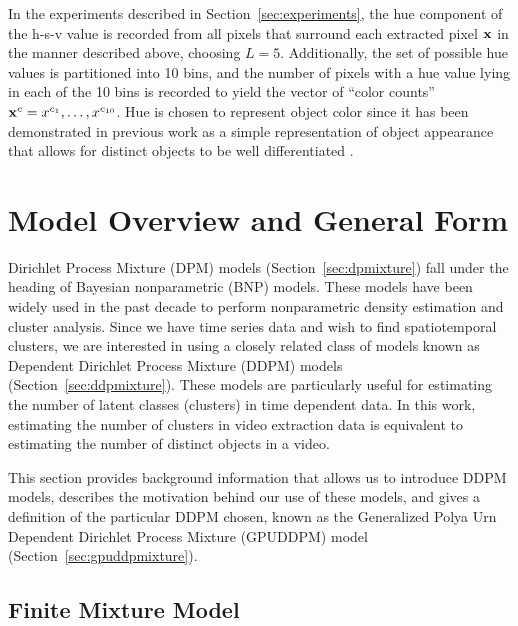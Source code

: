\documentclass[twocolumn, final]{svjour3}
\begin{document}
In the experiments described in Section~\ref{sec:experiments}, the hue component of the h-s-v value is recorded from all pixels that surround each extracted pixel $\bold{x}$ in the manner described above, choosing $L=5$. Additionally, the set of possible hue values is partitioned into 10 bins, and the number of pixels with a hue value lying in each of the 10 bins is recorded to yield the vector of ``color counts'' $\bold{x}^{c} = x^{c_{1}}, \ldots, x^{c_{10}}$. Hue is chosen to represent object color since it has been demonstrated in previous work as a simple representation of object appearance that allows for distinct objects to be well differentiated \cite{perez_2002, raja_1998, mckenna_1999}.




\section{Model Overview and General Form}
\label{sec:modeloverview}

Dirichlet Process Mixture (DPM) models (Section~\ref{sec:dpmixture}) fall under the heading of Bayesian nonparametric (BNP) models. These models have been widely used in the past decade to perform nonparametric density estimation and cluster analysis. Since we have time series data and wish to find spatiotemporal clusters, we are interested in using a closely related class of models known as Dependent Dirichlet Process Mixture (DDPM) models (Section~\ref{sec:ddpmixture}). These models are particularly useful for estimating the number of latent classes (clusters) in time dependent data. In this work, estimating the number of clusters in video extraction data is equivalent to estimating the number of distinct objects in a video.

This section provides background information that allows us to introduce DDPM models, describes the motivation behind our use of these models, and gives a definition of the particular DDPM chosen, known as the Generalized Polya Urn Dependent Dirichlet Process Mixture (GPUDDPM) model (Section~\ref{sec:gpuddpmixture}).


\subsection{Finite Mixture Model}
\label{sec:finitemixture}
\end{document}
